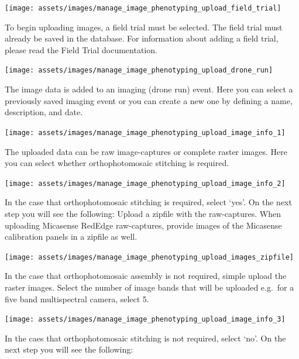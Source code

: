 \documentclass[
  12pt,
]{book}
\begin{document}
\begin{center}\texttt{[image: assets/images/manage\_image\_phenotyping\_upload\_field\_trial]} \end{center}

To begin uploading images, a field trial must be selected. The field trial must already be saved in the database. For information about adding a field trial, please read the Field Trial documentation.

\begin{center}\texttt{[image: assets/images/manage\_image\_phenotyping\_upload\_drone\_run]} \end{center}

The image data is added to an imaging (drone run) event. Here you can select a previously saved imaging event or you can create a new one by defining a name, description, and date.

\begin{center}\texttt{[image: assets/images/manage\_image\_phenotyping\_upload\_image\_info\_1]} \end{center}

The uploaded data can be raw image-captures or complete raster images. Here you can select whether orthophotomosaic stitching is required.

\begin{center}\texttt{[image: assets/images/manage\_image\_phenotyping\_upload\_image\_info\_2]} \end{center}

In the case that orthophotomosaic stitching is required, select `yes'. On the next step you will see the following: Upload a zipfile with the raw-captures. When uploading Micasense RedEdge raw-captures, provide images of the Micasense calibration panels in a zipfile as well.

\begin{center}\texttt{[image: assets/images/manage\_image\_phenotyping\_upload\_images\_zipfile]} \end{center}

In the case that orthophotomosaic assembly is not required, simple upload the raster images. Select the number of image bands that will be uploaded e.g.~for a five band multispectral camera, select 5.

\begin{center}\texttt{[image: assets/images/manage\_image\_phenotyping\_upload\_image\_info\_3]} \end{center}

In the caes that orthophotomosaic stitching is not required, select `no'. On the next step you will see the following:
\end{document}
